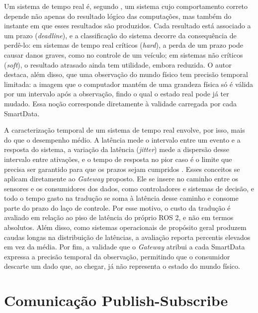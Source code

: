 \documentclass[
    12pt,
    oneside,
    a4paper,
    chapter=TITLE,
    section=TITLE,
    english,
    brazil
]{abntex2}
\begin{document}
Um sistema de tempo real é, segundo , um
sistema cujo comportamento correto depende não apenas do resultado lógico
das computações, mas também do instante em que esses resultados são
produzidos. Cada resultado está associado a um prazo (\textit{deadline}),
e a classificação do sistema decorre da consequência de perdê-lo: em
sistemas de tempo real críticos (\textit{hard}), a perda de um prazo pode
causar danos graves, como no controle de um veículo; em sistemas não
críticos (\textit{soft}), o resultado atrasado ainda tem utilidade,
embora reduzida. O autor destaca, além disso, que uma observação do mundo
físico tem precisão temporal limitada: a imagem que o computador mantém de
uma grandeza física só é válida por um intervalo após a observação, findo
o qual o estado real pode já ter mudado. Essa noção corresponde
diretamente à validade carregada por cada SmartData.

A caracterização temporal de um sistema de tempo real envolve, por isso,
mais do que o desempenho médio. A latência mede o intervalo entre um
evento e a resposta do sistema, a variação da latência (\textit{jitter})
mede a dispersão desse intervalo entre ativações, e o tempo de resposta
no pior caso é o limite que precisa ser garantido para que os prazos
sejam cumpridos \cite{kopetz2011realtime}. Esses conceitos se aplicam
diretamente ao \textit{Gateway} proposto. Ele se insere no caminho entre
os sensores e os consumidores dos dados, como controladores e sistemas de
decisão, e todo o tempo gasto na tradução se soma à latência desse
caminho e consome parte do prazo do laço de controle. Por esse motivo, o
custo da tradução é avaliado em relação ao piso de latência do próprio
ROS 2, e não em termos absolutos. Além disso, como sistemas operacionais
de propósito geral produzem caudas longas na distribuição de latências,
a avaliação reporta percentis elevados em vez da média. Por fim, a
validade que o \textit{Gateway} atribui a cada SmartData expressa a
precisão temporal da observação, permitindo que o consumidor descarte um
dado que, ao chegar, já não representa o estado do mundo físico.

\section{Comunicação Publish-Subscribe}
\label{sec:pubsub}
\end{document}
